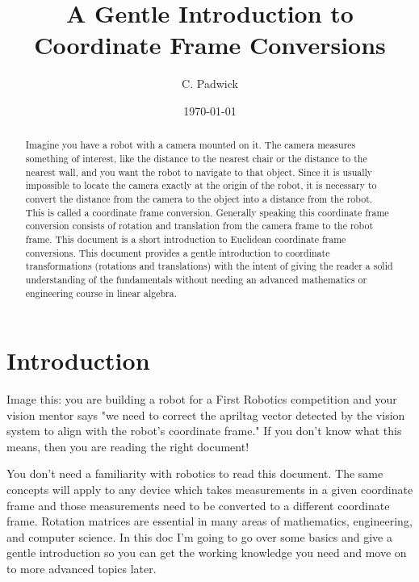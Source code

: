 \documentclass[11pt]{article}
\title{\textbf{A Gentle Introduction to Coordinate Frame Conversions}}
\author{C. Padwick}
\date{\today}
\begin{document}
\maketitle
\tableofcontents
\clearpage

\begin{abstract}
Imagine you have a robot with a camera mounted on it.  The camera measures something of interest,
like the distance to the nearest chair or the distance to the nearest wall, and you 
want the robot to navigate to that object.  Since it is usually impossible to locate the
camera exactly at the origin of the robot, it is necessary to convert the distance from the
camera to the object into a distance from the robot.  This is called a coordinate frame conversion.  
Generally speaking this coordinate frame conversion consists of rotation and translation from the
camera frame to the robot frame. This document is a short introduction to Euclidean coordinate frame conversions.
This document provides a gentle introduction to coordinate transformations (rotations and translations)
with the intent of giving the reader a solid understanding of the fundamentals without needing
an advanced mathematics or engineering course in linear algebra.
\end{abstract}

\section{Introduction}
\label{sec:intro}

Image this: you are building a robot for a First Robotics competition and your vision mentor says "we need 
to correct the apriltag vector detected by the vision system to align with the robot's coordinate frame."
If you don't know what this means, then you are reading the right document!

You don't need a familiarity with robotics to read this document.  The same concepts will
apply to any device which takes measurements in a given coordinate frame and those measurements
need to be converted to a different coordinate frame.  Rotation matrices are essential in many 
areas of mathematics, engineering, and computer science.  In this doc I'm going to go over
some basics and give a gentle introduction so you can get the working knowledge you need and
move on to more advanced topics later.
\end{document}
